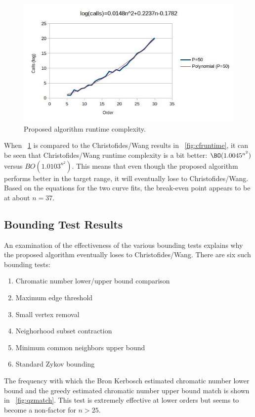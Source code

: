 \begin{figure}[H]
  \centering
  \includegraphics[width=5in]{qz_runtime}
  \caption{Proposed algorithm runtime complexity.}
  \label{fig:qzruntime}
\end{figure}

When \figurename~\ref{fig:qzruntime} is compared to the Christofides/Wang results in
\figurename~\ref{fig:cfruntime}, it can be seen that Christofides/Wang runtime complexity is a bit better:
\(\BO(1.0045^{n^2})\) versus \(BO(1.0103^{n^2})\).  This means that even though the proposed algorithm performs
better in the target range, it will eventually lose to Christofides/Wang.  Based on the equations for the two curve
fits, the break-even point appears to be at about \(n=37\).

\subsection{Bounding Test Results}\label{sec:sub:bounding}

An examination of the effectiveness of the various bounding tests explains why the proposed algorithm eventually
loses to Christofides/Wang.  There are six such bounding tests:
\begin{enumerate}
\item Chromatic number lower/upper bound comparison
\item Maximum edge threshold
\item Small vertex removal
\item Neighorhood subset contraction
\item Minimum common neighbors upper bound
\item Standard Zykov bounding
\end{enumerate}

The frequency with which the Bron Kerbosch estimated chromatic number lower bound and the greedy estimated chromatic
number upper bound match is shown in \figurename~\ref{fig:qzmatch}.  This test is extremely effective at lower orders
but seems to become a non-factor for \(n>25\).

